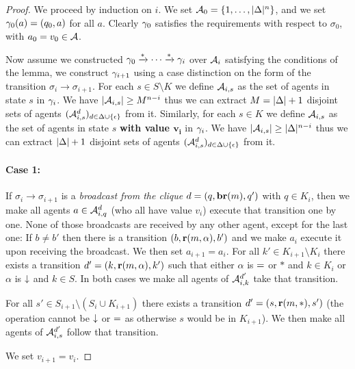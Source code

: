 \begin{proof}

We proceed by induction on $i$.
We set $\mathcal{A}_0 = \{1, \ldots, |\Delta|^n\}$, and we set $\gamma_0(a) = (q_0, a)$ for all $a$. Clearly $\gamma_0$ satisfies the requirements with respect to $\sigma_0$, with $a_0 = v_0 \in \mathcal{A}$.

Now assume we constructed $\gamma_0 \xrightarrow{*} \cdots \xrightarrow{*} \gamma_{i}$ over $\mathcal{A}_i$ satisfying the conditions of the lemma, we construct $\gamma_{i+1}$ using a case distinction on the form of the transition $\sigma_i \to \sigma_{i+1}$.
For each $s \in S\setminus K$ we define $\mathcal{A}_{i,s}$ as the set of agents in state $s$ in $\gamma_{i}$. We have $|\mathcal{A}_{i,s}| \geq M^{n-i}$ thus we can extract $M = |\Delta|+1$ disjoint sets of agents $(\mathcal{A}_{i,s}^d)_{d \in \Delta\cup\{\epsilon\}}$ from it.
Similarly, for each $s \in K$ we define $\mathcal{A}_{i,s}$ as the set of agents in state $s$ \textbf{with value $\mathbf{v_i}$} in $\gamma_{i}$. We have $|\mathcal{A}_{i,s}| \geq |\Delta|^{n-i}$ thus we can extract $|\Delta|+1$ disjoint sets of agents $(\mathcal{A}_{i,s}^d)_{d \in \Delta\cup\{\epsilon\}}$ from it.


\paragraph{Case 1: } If $\sigma_i \to \sigma_{i+1}$ is a \emph{broadcast from the clique} $d = (q, \textbf{br}(m), q')$ with $q \in K_i$, then we make all agents $a \in \mathcal{A}_{i,q}^{d}$ (who all have value $v_i$) execute that transition one by one.
None of those broadcasts are received by any other agent, except for the last one:
If $b \neq b'$ then there is a transition $(b, \textbf{r}(m, \alpha), b')$ and we make $a_i$ execute it upon receiving the broadcast. We then set $a_{i+1} = a_i$.
For all $k' \in K_{i+1} \setminus K_i$ there exists a transition $d'=(k, \textbf{r}(m, \alpha), k')$ such that either $\alpha$ is ${=}$ or $*$ and $k \in K_i$ or $\alpha$ is $\downarrow$ and $k\in S$.
In both cases we make all agents of $\mathcal{A}_{i,k}^{d'}$ take that transition.

For all $s' \in S_{i+1} \setminus (S_i \cup K_{i+1})$ there exists a transition $d'=(s,\textbf{r}(m, *),s')$ (the operation cannot be $\downarrow$ or ${=}$ as otherwise $s$ would be in $K_{i+1}$). We then make all agents of $\mathcal{A}_{i,s}^{d'}$ follow that transition. 

We set $v_{i+1} = v_i$.


\end{proof}
